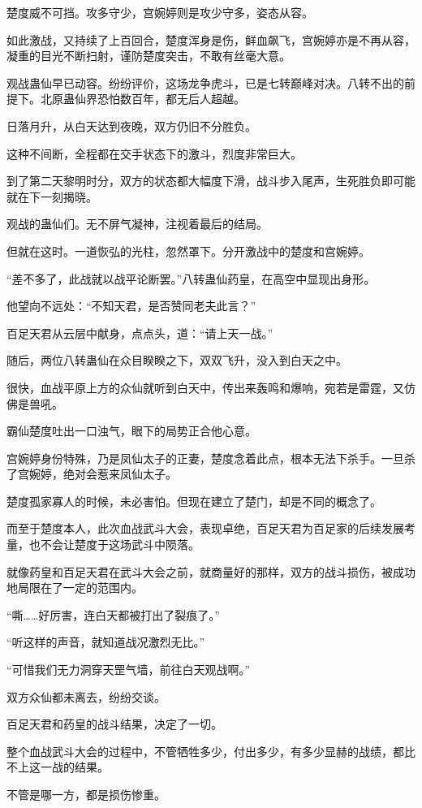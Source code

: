 \begin{this_body}
楚度威不可挡。攻多守少，宫婉婷则是攻少守多，姿态从容。

如此激战，又持续了上百回合，楚度浑身是伤，鲜血飙飞，宫婉婷亦是不再从容，凝重的目光不断扫射，谨防楚度突击，不敢有丝毫大意。

观战蛊仙早已动容。纷纷评价，这场龙争虎斗，已是七转巅峰对决。八转不出的前提下。北原蛊仙界恐怕数百年，都无后人超越。

日落月升，从白天达到夜晚，双方仍旧不分胜负。

这种不间断，全程都在交手状态下的激斗，烈度非常巨大。

到了第二天黎明时分，双方的状态都大幅度下滑，战斗步入尾声，生死胜负即可能就在下一刻揭晓。

观战的蛊仙们。无不屏气凝神，注视着最后的结局。

但就在这时。一道恢弘的光柱，忽然罩下。分开激战中的楚度和宫婉婷。

“差不多了，此战就以战平论断罢。”八转蛊仙药皇，在高空中显现出身形。

他望向不远处：“不知天君，是否赞同老夫此言？”

百足天君从云层中献身，点点头，道：“请上天一战。”

随后，两位八转蛊仙在众目睽睽之下，双双飞升，没入到白天之中。

很快，血战平原上方的众仙就听到白天中，传出来轰鸣和爆响，宛若是雷霆，又仿佛是兽吼。

霸仙楚度吐出一口浊气，眼下的局势正合他心意。

宫婉婷身份特殊，乃是凤仙太子的正妻，楚度念着此点，根本无法下杀手。一旦杀了宫婉婷，绝对会惹来凤仙太子。

楚度孤家寡人的时候，未必害怕。但现在建立了楚门，却是不同的概念了。

而至于楚度本人，此次血战武斗大会，表现卓绝，百足天君为百足家的后续发展考量，也不会让楚度于这场武斗中陨落。

就像药皇和百足天君在武斗大会之前，就商量好的那样，双方的战斗损伤，被成功地局限在了一定的范围内。

“嘶……好厉害，连白天都被打出了裂痕了。”

“听这样的声音，就知道战况激烈无比。”

“可惜我们无力洞穿天罡气墙，前往白天观战啊。”

双方众仙都未离去，纷纷交谈。

百足天君和药皇的战斗结果，决定了一切。

整个血战武斗大会的过程中，不管牺牲多少，付出多少，有多少显赫的战绩，都比不上这一战的结果。

不管是哪一方，都是损伤惨重。


\end{this_body}
